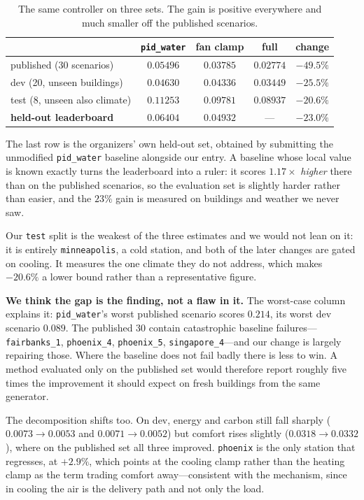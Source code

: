 \documentclass[10pt]{article}
\begin{document}
\begin{table}[h]
\centering
\caption{The same controller on three sets. The gain is positive everywhere
and much smaller off the published scenarios.}
\begin{tabular}{lcccc}
\toprule
 & \texttt{pid\_water} & fan clamp & full & change \\
\midrule
published (30 scenarios)         & $0.05496$ & $0.03785$ & $0.02774$ & $-49.5\%$ \\
dev (20, unseen buildings)       & $0.04630$ & $0.04336$ & $0.03449$ & $-25.5\%$ \\
test (8, unseen also climate)    & $0.11253$ & $0.09781$ & $0.08937$ & $-20.6\%$ \\
\midrule
\textbf{held-out leaderboard}    & $\mathbf{0.06404}$ & $\mathbf{0.04932}$ & --- & $\mathbf{-23.0\%}$ \\
\bottomrule
\end{tabular}
\label{tab:holdout}
\end{table}

The last row is the organizers' own held-out set, obtained by submitting the
unmodified \texttt{pid\_water} baseline alongside our entry. A baseline whose
local value is known exactly turns the leaderboard into a ruler: it scores
$1.17\times$ \emph{higher} there than on the published scenarios, so the
evaluation set is slightly harder rather than easier, and the $23\%$ gain is
measured on buildings and weather we never saw.

Our \texttt{test} split is the weakest of the three estimates and we would not
lean on it: it is entirely \texttt{minneapolis}, a cold station, and both of
the later changes are gated on cooling. It measures the one climate they do
not address, which makes $-20.6\%$ a lower bound rather than a representative
figure.

\textbf{We think the gap is the finding, not a flaw in it.} The worst-case
column explains it: \texttt{pid\_water}'s worst published scenario scores
$0.214$, its worst dev scenario $0.089$. The published 30 contain catastrophic
baseline failures---\texttt{fairbanks\_1}, \texttt{phoenix\_4},
\texttt{phoenix\_5}, \texttt{singapore\_4}---and our change is largely
repairing those. Where the baseline does not fail badly there is less to win.
A method evaluated only on the published set would therefore report roughly
five times the improvement it should expect on fresh buildings from the same
generator.

The decomposition shifts too. On dev, energy and carbon still fall sharply
($0.0073\!\to\!0.0053$ and $0.0071\!\to\!0.0052$) but comfort rises slightly
($0.0318\!\to\!0.0332$), where on the published set all three improved.
\texttt{phoenix} is the only station that regresses, at $+2.9\%$, which points
at the cooling clamp rather than the heating clamp as the term trading comfort
away---consistent with the mechanism, since in cooling the air is the delivery
path and not only the load.
\end{document}
